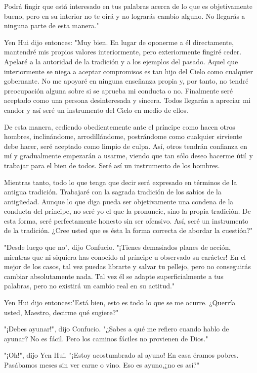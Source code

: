 Podrá fingir que está interesado en tus palabras acerca de lo que es
objetivamente bueno, pero en su interior no te oirá y no lograrás cambio
alguno. No llegarás a ninguna parte de esta manera."

Yen Hui dijo entonces: "Muy bien. En lugar de oponerme a él
directamente, mantendré mis propios valores interiormente, pero
exteriormente fingiré ceder. Apelaré a la autoridad de la tradición y a
los ejemplos del pasado. Aquel que interiormente se niega a aceptar
compromisos es tan hijo del Cielo como cualquier gobernante. No me
apoyaré en ninguna enseñanza propia y, por tanto, no tendré preocupación
alguna sobre si se aprueba mi conducta o no. Finalmente seré aceptado
como una persona desinteresada y sincera. Todos llegarán a apreciar mi
candor y así seré un instrumento del Cielo en medio de ellos.

De esta manera, cediendo obedientemente ante el príncipe como hacen
otros hombres, inclinándome, arrodillándome, postrándome como cualquier
sirviente debe hacer, seré aceptado como limpio de culpa. Así, otros
tendrán confianza en mí y gradualmente empezarán a usarme, viendo que
tan sólo deseo hacerme útil y trabajar para el bien de todos. Seré así
un instrumento de los hombres.

Mientras tanto, todo lo que tenga que decir será expresado en términos
de la antigua tradición. Trabajaré con la sagrada tradición de los
sabios de la antigüedad. Aunque lo que diga pueda ser objetivamente una
condena de la conducta del príncipe, no seré yo el que la pronuncie,
sino la propia tradición. De esta forma, seré perfectamente honesto sin
ser ofensivo. Así, seré un instrumento de la tradición. ¿Cree usted que
es ésta la forma correcta de abordar la cuestión?"

"Desde luego que no", dijo Confucio. "¡Tienes demasiados planes de
acción, mientras que ni siquiera has conocido al príncipe u observado su
carácter! En el mejor de los casos, tal vez puedas librarte y salvar tu
pellejo, pero no conseguirás cambiar absolutamente nada. Tal vez él se
adapte superficialmente a tus palabras, pero no existirá un cambio real
en su actitud."

Yen Hui dijo entonces:"Está bien, esto es todo lo que se me ocurre.
¿Querría usted, Maestro, decirme qué sugiere?"

"¡Debes ayunar!", dijo Confucio. "¿Sabes a qué me refiero cuando hablo
de ayunar? No es fácil. Pero los caminos fáciles no provienen de Dios."

"¡Oh!", dijo Yen Hui. "¡Estoy acostumbrado al ayuno! En casa éramos
pobres. Pasábamos meses sin ver carne o vino. Eso es ayuno,¿no es así?"

